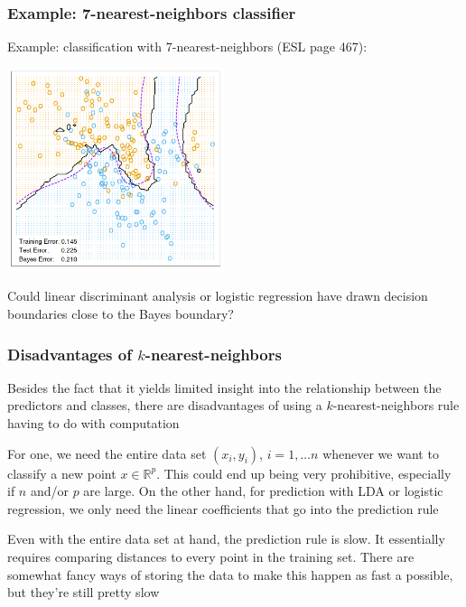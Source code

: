 \documentclass[mathserif]{beamer}
\def\R{\mathds{R}}
\def\red{\color[rgb]{0.8,0,0}}
\begin{document}
\begin{frame}
\frametitle{Example: 7-nearest-neighbors classifier}
\smallskip
\smallskip
Example: classification with 7-nearest-neighbors (ESL page 467):
\begin{center}
\includegraphics[width=2.5in]{7nn.png}
\end{center}
Could linear discriminant analysis or logistic regression have drawn decision 
boundaries close to the Bayes boundary? 
\end{frame}

\begin{frame}
\frametitle{Disadvantages of $k$-nearest-neighbors}
Besides the fact that it yields {\red limited insight} into the relationship 
between the predictors
and classes, there are disadvantages of using a $k$-nearest-neighbors rule having
to do with {\red computation}

\bigskip
For one, we need the {\red entire data set} $(x_i,y_i)$, $i=1,\ldots n$ 
whenever we want to classify a new point $x \in \R^p$. This could end
up being very prohibitive, especially if $n$ and/or $p$ are large. 
On the other hand, for prediction with LDA or logistic regression, we only need
the linear coefficients that go into the prediction rule

\bigskip
Even with the entire data set at hand, the prediction rule is {\red slow}. It essentially
requires comparing distances to every point in the training set. There are somewhat 
fancy ways of storing the data to make this happen as fast a possible, but they're 
still pretty slow
\end{frame}
\end{document}
